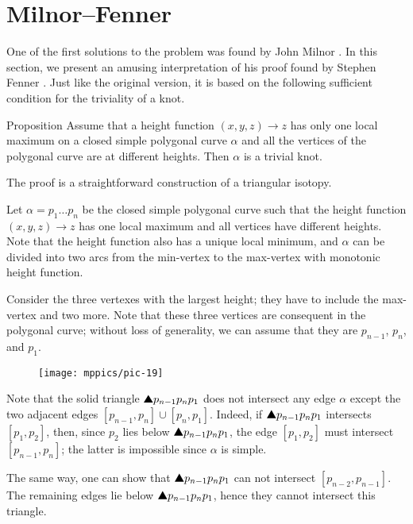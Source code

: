 \section{Milnor--Fenner}

One of the first solutions to the problem was found by John Milnor \cite{milnor}.
In this section, we present an amusing interpretation of his proof found by Stephen Fenner \cite{ferner}.
Just like the original version, it is based on the following sufficient condition for the triviality of a knot.

\begin{thm}{Proposition}\label{prop:one-max-one-min}
Assume that a height function $(x,y,z)\to z$ 
has only one local maximum on a closed simple polygonal curve $\alpha$ and all the vertices of the polygonal curve are at different heights.
Then $\alpha$ is a trivial knot.
\end{thm}

The proof is a straightforward construction of a triangular isotopy. 

Let $\alpha=p_1\dots p_n$ be the closed simple polygonal curve
such that the height function $(x,y,z)\to z$ has one local maximum and all vertices have different heights.
Note that the height function also has a unique local minimum,
and $\alpha$ can be divided into two arcs from the min-vertex to the max-vertex with monotonic height function.

Consider the three vertexes with the largest height;
they have to include the max-vertex and two more.
Note that these three vertices are consequent in the polygonal curve; 
without loss of generality, we can assume that they are $p_{n-1}$, $p_n$, and $p_1$.

\begin{wrapfigure}{r}{30 mm}
\vskip-0mm
\centering
\texttt{[image: mppics/pic-19]}
\vskip0mm
\end{wrapfigure}

Note that the solid triangle $\solidtriangle p_{n-1}p_np_1$ does not intersect any edge $\alpha$ except the two adjacent edges $[p_{n-1},p_n]\cup[p_n,p_1]$.
Indeed, if $\solidtriangle p_{n-1}p_np_1$ intersects $[p_1,p_2]$,
then, 
since $p_2$ lies below $\solidtriangle p_{n-1}p_np_1$,
the edge $[p_1,p_2]$ must intersect $[p_{n-1},p_n]$;
the latter is impossible since $\alpha$ is simple.

The same way, one can show that $\solidtriangle p_{n-1}p_np_1$ can not intersect $[p_{n-2},p_{n-1}]$.
The remaining edges lie below $\solidtriangle p_{n-1}p_np_1$, hence they cannot intersect this triangle.


